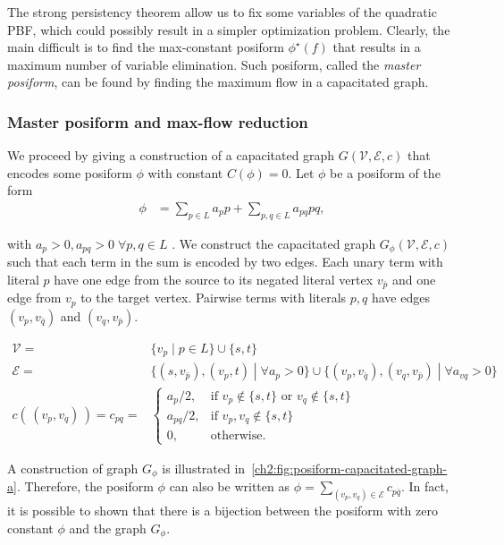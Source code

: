 The strong persistency theorem allow us to fix some variables of the quadratic PBF, which could possibly result in a simpler optimization problem. Clearly, the main difficult is to find the max-constant posiform $\phi^{\star}(f)$ that results in a maximum number of variable elimination. Such posiform, called the \emph{master posiform}, can be found by finding the maximum flow in a capacitated graph.

\subsubsection{Master posiform and max-flow reduction}

We proceed by giving a construction of a capacitated graph $G(\mathcal{V},\mathcal{E},c)$ that encodes some posiform $\phi$ with constant $C(\phi)=0$. Let $\phi$ be a posiform of the form
	\begin{align*}
		\phi &= \sum_{p \in L}{a_pp} + \sum_{p,q \in L}{a_{pq}pq},
	\end{align*}
	
with $a_p >0, a_{pq}>0\; \forall p,q \in L$	. We  construct the capacitated graph $G_{\phi}(\mathcal{V},\mathcal{E},c)$ such that each term in the sum is encoded by two edges. Each unary term with literal $p$ have one edge from the source to its negated literal vertex $v_{\bar{p}}$ and one edge from $v_p$ to the target vertex. Pairwise terms with literals $p,q$ have edges $(v_p,v_{\bar{q}})$ and $(v_q,v_{\bar{p}})$.

\begin{align*}
	\mathcal{V} =& \{ v_p \; | \; p \in L \} \cup \{s,t\} \\[1em]
	\mathcal{E} =& \big\{ (s, v_{\bar{p}}),(v_p,t) \; | \; \forall a_p>0 \big\} \cup \big\{ (v_p,v_{\bar{q}} ), (v_q,v_{\bar{p}} ) \; | \; \forall a_{vq} > 0 \big\}  \\[1em]
	c(\, (v_p,v_q)\, ) = c_{pq} =& \left\{ \begin{array}{rl}
		a_{p}/2, & \text{if } v_p \notin \{s,t\} \text{ or } v_q \notin \{s,t\} \\
		a_{pq}/2, & \text{if } v_p,v_q \notin \{s,t\}\\ 
		0,& \text{otherwise}.
	\end{array}\right.
\end{align*}

A construction of graph $G_{\phi}$ is illustrated in~\cref{ch2:fig:posiform-capacitated-graph-a}. Therefore, the posiform $\phi$ can also be written as $\phi = \sum_{(v_p,v_q) \in \mathcal{E}}{ c_{p\bar{q}} }$. In fact, it is possible to shown that there is a bijection between the posiform with zero constant $\phi$ and the graph $G_{\phi}$.


